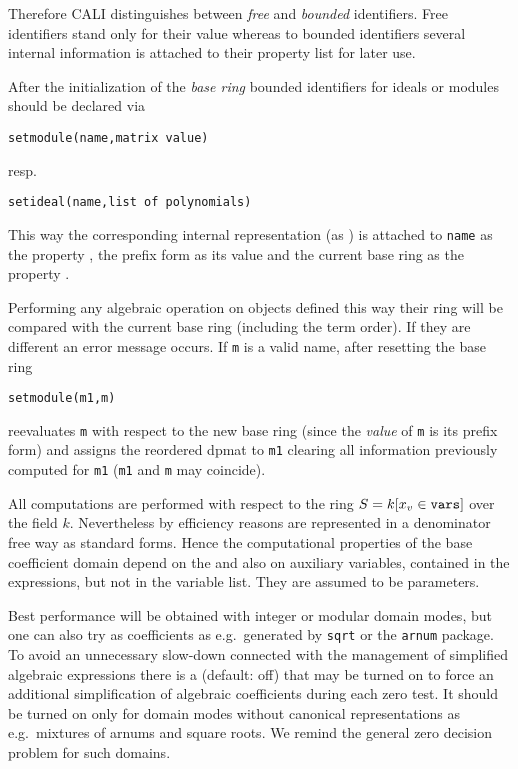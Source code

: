 Therefore CALI distinguishes between {\em free} and {\em bounded}
 identifiers. Free
identifiers stand only for their value whereas to bounded identifiers
several internal information is attached to their property list for
later use.
\medskip

After the initialization of the {\em base ring} bounded identifiers
for ideals or modules should be declared via
\begin{verbatim}
setmodule(name,matrix value)
\end{verbatim}
resp.
\begin{verbatim}
setideal(name,list of polynomials)
\end{verbatim}
This way the corresponding internal representation (as )
is attached to {\tt name} as the property , the prefix
form as its value and the current base ring as the property
.

Performing any algebraic operation on objects defined this way their
ring will be compared with the current base ring (including the term
order). If they are different an error message occurs. If {\tt m} is
a valid name, after resetting the base ring
\begin{verbatim}
setmodule(m1,m)
\end{verbatim}
reevaluates {\tt m} with respect to the new base ring (since the
{\em value} of {\tt m} is its prefix form) and assigns the reordered
dpmat to {\tt m1} clearing all information previously computed for
{\tt m1} ({\tt m1} and {\tt m} may coincide).

All computations are performed with respect to the ring $S=k[x_v\in
{\tt vars}]$ over the field $k$. Nevertheless by efficiency reasons
 are represented in a denominator free way as
standard forms. Hence the computational properties of the base
coefficient domain depend on the  and also on auxiliary
variables, contained in the expressions, but not in the variable
list. They are assumed to be parameters. 

Best performance will be obtained with integer or modular domain
modes, but one can also try  as coefficients
as e.g.\ generated by {\tt sqrt} or the {\tt arnum} package. To avoid
an unnecessary slow-down connected with the management of simplified
algebraic expressions there is a  (default:
off) that may be turned on to force an additional simplification of
algebraic coefficients during each zero test. It should be turned on
only for domain modes without canonical representations as e.g.\
mixtures of arnums and square roots. We remind the general zero
decision problem for such domains. 

